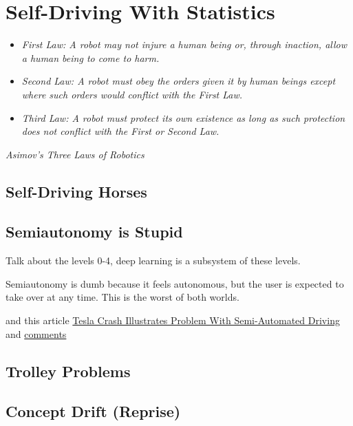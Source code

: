 \setchapterpreamble[u]{\margintoc}
\chapter{Self-Driving With Statistics}

\begin{itemize}
    \item\textit{First Law: A robot may not injure a human being or, through inaction, allow a human being to come to harm.}
    \item\textit{Second Law: A robot must obey the orders given it by human beings except where such orders would conflict with the First Law.}
    \item\textit{Third Law: A robot must protect its own existence as long as such protection does not conflict with the First or Second Law.}
\end{itemize} 
\textit{Asimov's Three Laws of Robotics}

\section{Self-Driving Horses}

\section{Semiautonomy is Stupid}

Talk about the levels 0-4, deep learning is a subsystem of these levels.

Semiautonomy is dumb because it feels autonomous, but the user is expected to take over at any time. This is the worst of both worlds. \cite{torchinsky_boeckmann_2019}

and this article \href{https://www.theautopian.com/newly-released-video-of-thanksgiving-day-tesla-full-self-driving-crash-demonstrates-the-fundamental-problem-of-semi-automated-driving-systems/}{Tesla Crash Illustrates Problem With Semi-Automated Driving} and \href{https://news.ycombinator.com/item?id=34347778}{comments}

\section{Trolley Problems}

\section{Concept Drift (Reprise)}

